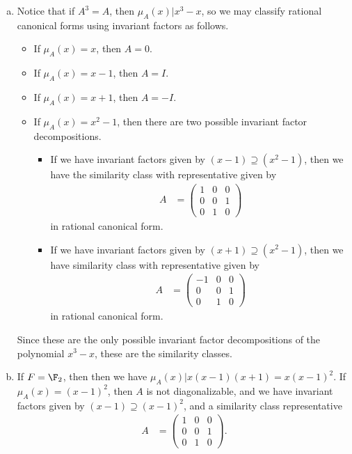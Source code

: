 \documentclass[10pt]{mypackage}
\begin{document}
\begin{solution}\hfill
  \begin{enumerate}[(a)]
    \item Notice that if $A^3 = A$, then $\mu_A(x) | x^3-x$, so we may classify rational canonical forms using invariant factors as follows.
      \begin{itemize}
        \item If $\mu_A(x) = x$, then $A = 0$.
        \item If $\mu_A(x) = x-1$, then $A = I$.
        \item If $\mu_A(x) = x + 1$, then $A = -I$.
        \item If $\mu_A(x) = x^2 - 1$, then there are two possible invariant factor decompositions.
          \begin{itemize}
            \item If we have invariant factors given by $ \left( x-1 \right)\supseteq \left( x^2 - 1 \right) $, then we have the similarity class with representative given by
              \begin{align*}
                A &= \begin{pmatrix}1 & 0 & 0 \\ 0 & 0 & 1 \\ 0 & 1 & 0\end{pmatrix}
              \end{align*}
              in rational canonical form.
            \item If we have invariant factors given by $ \left( x+1 \right)\supseteq \left( x^2-1 \right) $, then we have similarity class with representative given by
              \begin{align*}
                A &= \begin{pmatrix}-1 & 0 & 0 \\ 0 & 0 & 1 \\ 0 & 1 & 0\end{pmatrix}
              \end{align*}
              in rational canonical form.
          \end{itemize}
      \end{itemize}
      Since these are the only possible invariant factor decompositions of the polynomial $x^3 - x$, these are the similarity classes.
    \item If $F = \F_2$, then then we have $\mu_A(x) | x\left( x-1 \right)\left( x+1 \right) = x\left( x-1 \right)^2$. If $\mu_A(x) = \left( x-1 \right)^2$, then $A$ is not diagonalizable, and we have invariant factors given by $\left( x-1 \right)\supseteq \left( x-1 \right)^2$, and a similarity class representative
      \begin{align*}
        A &= \begin{pmatrix}1 & 0 & 0 \\ 0 & 0 & 1 \\ 0 & 1 & 0\end{pmatrix}.
      \end{align*}
  \end{enumerate}
\end{solution}
\end{document}
